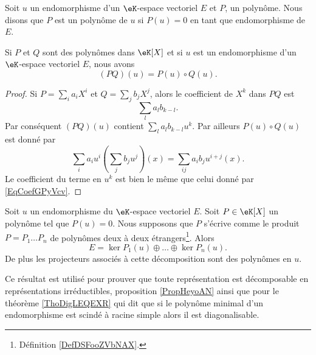 Soit \( u\) un endomorphisme d'un \( \eK\)-espace vectoriel \( E\) et \( P\), un polynôme. Nous disons que \( P\) est un polynôme  de \( u\) si \( P(u)=0\) en tant que endomorphisme de \( E\).

\begin{lemma}       \label{LemQWvhYb}
    Si \( P\) et \( Q\) sont des polynômes dans \( \eK[X]\) et si \( u\) est un endomorphisme d'un \( \eK\)-espace vectoriel \( E\), nous avons
    \begin{equation}
        (PQ)(u)=P(u)\circ Q(u).
    \end{equation}
\end{lemma}

\begin{proof}
    Si \( P=\sum_i a_iX^i\) et \( Q=\sum_j b_jX^j\), alors le coefficient de \( X^k\) dans \( PQ\) est
    \begin{equation}        \label{EqCoefGPyVcv}
        \sum_la_lb_{k-l}.
    \end{equation}
    Par conséquent \( (PQ)(u)\) contient \( \sum_la_lb_{k-l}u^k\). Par ailleurs \( P(u)\circ Q(u)\) est donné par
    \begin{equation}
        \sum_ia_iu^i\left( \sum_jb_ju^j \right)(x)=\sum_{ij}a_ib_ju^{i+j}(x).
    \end{equation}
    Le coefficient du terme en \( u^k\) est bien le même que celui donné par \eqref{EqCoefGPyVcv}.
\end{proof}

\begin{theorem}       \label{ThoDecompNoyayzzMWod}
    Soit \( u\) un endomorphisme du \( \eK\)-espace vectoriel \( E\). Soit \( P\in\eK[X]\) un polynôme tel que \( P(u)=0\). Nous supposons que \( P\) s'écrive comme le produit \( P=P_1\ldots P_n\) de polynômes deux à deux étrangers\footnote{Définition \ref{DefDSFooZVbNAX}.}. Alors
    \begin{equation}
        E=\ker P_1(u)\oplus\ldots\oplus\ker P_n(u).
    \end{equation}
    De plus les projecteurs associés à cette décomposition sont des polynômes en \( u\).
\end{theorem}
Ce résultat est utilisé pour prouver que toute représentation est décomposable en représentations irréductibles, proposition \ref{PropHeyoAN} ainsi que pour le théorème \ref{ThoDigLEQEXR} qui dit que si le polynôme minimal d'un endomorphisme est scindé à racine simple alors il est diagonalisable.

